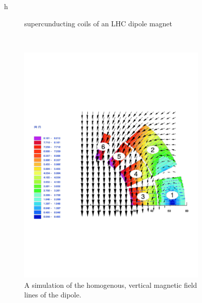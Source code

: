 \begin{figure}{h}
\begin{subfigure}[h]{0.450\textwidth}
{          supercunducting coils of an LHC dipole magnet}\label{fig:lhc_dipole_collarAndCoils}
      \end{subfigure}
      ~ %
      \begin{subfigure}[h]{0.450\textwidth}
        \includegraphics[width=\textwidth]{Figures/LHC_Diagrams/LHC_Dipole_Field.pdf}
        \caption{A simulation of the homogenous, vertical magnetic field lines of the
          dipole. }\label{fig:lhc_dipole_field}
      \end{subfigure}
       ~ %
      \begin{subfigure}[h]{0.450\textwidth}

\end{subfigure}
\end{figure}
